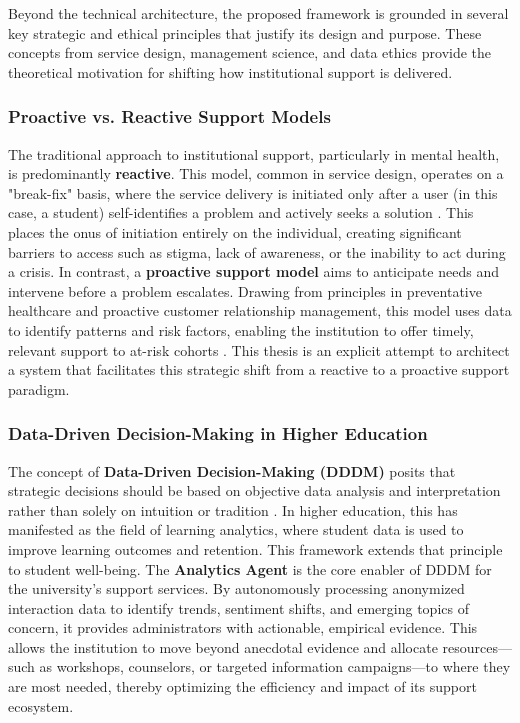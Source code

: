 Beyond the technical architecture, the proposed framework is grounded in several key strategic and ethical principles that justify its design and purpose. These concepts from service design, management science, and data ethics provide the theoretical motivation for shifting how institutional support is delivered.

\subsubsection{Proactive vs. Reactive Support Models}
The traditional approach to institutional support, particularly in mental health, is predominantly \textbf{reactive}. This model, common in service design, operates on a "break-fix" basis, where the service delivery is initiated only after a user (in this case, a student) self-identifies a problem and actively seeks a solution \cite{FIND_CITATION_PLEASE}. This places the onus of initiation entirely on the individual, creating significant barriers to access such as stigma, lack of awareness, or the inability to act during a crisis. In contrast, a \textbf{proactive support model} aims to anticipate needs and intervene before a problem escalates. Drawing from principles in preventative healthcare and proactive customer relationship management, this model uses data to identify patterns and risk factors, enabling the institution to offer timely, relevant support to at-risk cohorts \cite{FIND_CITATION_PLEASE}. This thesis is an explicit attempt to architect a system that facilitates this strategic shift from a reactive to a proactive support paradigm.

\subsubsection{Data-Driven Decision-Making in Higher Education}
The concept of \textbf{Data-Driven Decision-Making (DDDM)} posits that strategic decisions should be based on objective data analysis and interpretation rather than solely on intuition or tradition \cite{FIND_CITATION_PLEASE}. In higher education, this has manifested as the field of learning analytics, where student data is used to improve learning outcomes and retention. This framework extends that principle to student well-being. The \textbf{Analytics Agent} is the core enabler of DDDM for the university's support services. By autonomously processing anonymized interaction data to identify trends, sentiment shifts, and emerging topics of concern, it provides administrators with actionable, empirical evidence. This allows the institution to move beyond anecdotal evidence and allocate resources—such as workshops, counselors, or targeted information campaigns—to where they are most needed, thereby optimizing the efficiency and impact of its support ecosystem.

